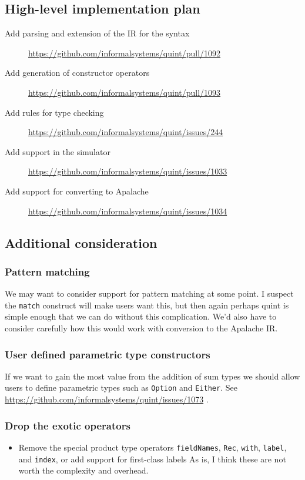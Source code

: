 \documentclass[11pt]{article}
\begin{document}
\subsection{High-level implementation plan}
\label{sec:orgd09f6a5}

\begin{description}
\item[{Add parsing and extension of the IR for the syntax}] \url{https://github.com/informalsystems/quint/pull/1092}
\item[{Add generation of constructor operators}] \url{https://github.com/informalsystems/quint/pull/1093}
\item[{Add rules for type checking}] \url{https://github.com/informalsystems/quint/issues/244}
\item[{Add support in the simulator}] \url{https://github.com/informalsystems/quint/issues/1033}
\item[{Add support for converting to Apalache}] \url{https://github.com/informalsystems/quint/issues/1034}
\end{description}

\subsection{Additional consideration}
\label{sec:org0d2407a}
\subsubsection{Pattern matching}
\label{sec:orgbddbca7}
We may want to consider support for pattern matching at some point. I suspect
the \texttt{match} construct will make users want this, but then again perhaps quint
is simple enough that we can do without this complication. We'd also have to
consider carefully how this would work with conversion to the Apalache IR.

\subsubsection{User defined parametric type constructors}
\label{sec:org1a4beae}

If we want to gain the most value from the addition of sum types we should allow
users to define parametric types such as \texttt{Option} and \texttt{Either}. See
\url{https://github.com/informalsystems/quint/issues/1073} .

\subsubsection{Drop the exotic operators}
\label{sec:orgd5aba72}
\begin{itemize}
\item Remove the special product type operators \texttt{fieldNames}, \texttt{Rec}, \texttt{with},
\texttt{label}, and \texttt{index}, or add support for first-class labels As is, I
think these are not worth the complexity and overhead.
\end{itemize}
\end{document}
